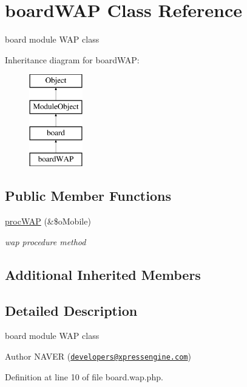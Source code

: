 \hypertarget{classboardWAP}{\section{board\+W\+A\+P Class Reference}
\label{classboardWAP}
}


board module W\+A\+P class  


Inheritance diagram for board\+W\+A\+P\+:\begin{figure}[H]
\begin{center}
\leavevmode
\includegraphics[height=4.000000cm]{classboardWAP}
\end{center}
\end{figure}
\subsection*{Public Member Functions}
\begin{DoxyCompactItemize}
\item 
\hyperlink{classboardWAP_a64fd2fe05d7bb01d701f07e763f54a4b}{proc\+W\+A\+P} (\&\$o\+Mobile)
\begin{DoxyCompactList}\small\item\em wap procedure method \end{DoxyCompactList}\end{DoxyCompactItemize}
\subsection*{Additional Inherited Members}


\subsection{Detailed Description}
board module W\+A\+P class 

\begin{DoxyAuthor}{Author}
N\+A\+V\+E\+R (\href{mailto:developers@xpressengine.com}{\tt developers@xpressengine.\+com}) 
\end{DoxyAuthor}


Definition at line 10 of file board.\+wap.\+php.



